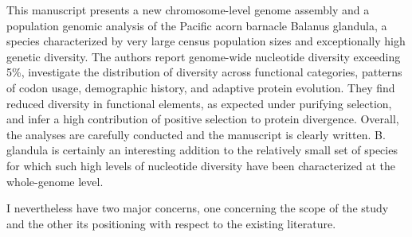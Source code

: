 


\begin{itquote}
This manuscript presents a new chromosome-level genome assembly and a
population genomic analysis of the Pacific acorn barnacle Balanus
glandula, a species characterized by very large census population sizes
and exceptionally high genetic diversity. The authors report genome-wide
nucleotide diversity exceeding 5\%, investigate the distribution of
diversity across functional categories, patterns of codon usage,
demographic history, and adaptive protein evolution. They find reduced
diversity in functional elements, as expected under purifying selection,
and infer a high contribution of positive selection to protein
divergence. Overall, the analyses are carefully conducted and the
manuscript is clearly written. B. glandula is certainly an interesting
addition to the relatively small set of species for which such high
levels of nucleotide diversity have been characterized at the
whole-genome level.

I nevertheless have two major concerns, one concerning the scope of the
study and the other its positioning with respect to the existing
literature.
\end{itquote}




